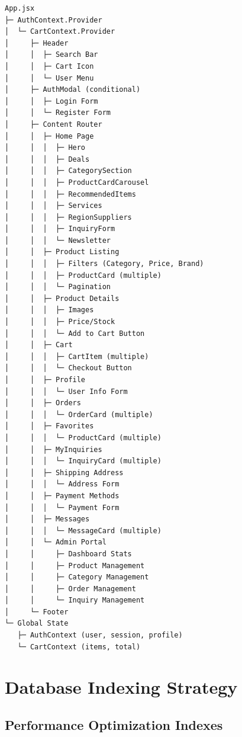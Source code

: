 \documentclass[12pt,a4paper]{report}
\begin{document}
\begin{lstlisting}[language=text, caption=Full Component Structure]
App.jsx
├─ AuthContext.Provider
│  └─ CartContext.Provider
│     ├─ Header
│     │  ├─ Search Bar
│     │  ├─ Cart Icon
│     │  └─ User Menu
│     ├─ AuthModal (conditional)
│     │  ├─ Login Form
│     │  └─ Register Form
│     ├─ Content Router
│     │  ├─ Home Page
│     │  │  ├─ Hero
│     │  │  ├─ Deals
│     │  │  ├─ CategorySection
│     │  │  ├─ ProductCardCarousel
│     │  │  ├─ RecommendedItems
│     │  │  ├─ Services
│     │  │  ├─ RegionSuppliers
│     │  │  ├─ InquiryForm
│     │  │  └─ Newsletter
│     │  ├─ Product Listing
│     │  │  ├─ Filters (Category, Price, Brand)
│     │  │  ├─ ProductCard (multiple)
│     │  │  └─ Pagination
│     │  ├─ Product Details
│     │  │  ├─ Images
│     │  │  ├─ Price/Stock
│     │  │  └─ Add to Cart Button
│     │  ├─ Cart
│     │  │  ├─ CartItem (multiple)
│     │  │  └─ Checkout Button
│     │  ├─ Profile
│     │  │  └─ User Info Form
│     │  ├─ Orders
│     │  │  └─ OrderCard (multiple)
│     │  ├─ Favorites
│     │  │  └─ ProductCard (multiple)
│     │  ├─ MyInquiries
│     │  │  └─ InquiryCard (multiple)
│     │  ├─ Shipping Address
│     │  │  └─ Address Form
│     │  ├─ Payment Methods
│     │  │  └─ Payment Form
│     │  ├─ Messages
│     │  │  └─ MessageCard (multiple)
│     │  └─ Admin Portal
│     │     ├─ Dashboard Stats
│     │     ├─ Product Management
│     │     ├─ Category Management
│     │     ├─ Order Management
│     │     └─ Inquiry Management
│     └─ Footer
└─ Global State
   ├─ AuthContext (user, session, profile)
   └─ CartContext (items, total)
\end{lstlisting}

\section{Database Indexing Strategy}

\subsection{Performance Optimization Indexes}
\end{document}
